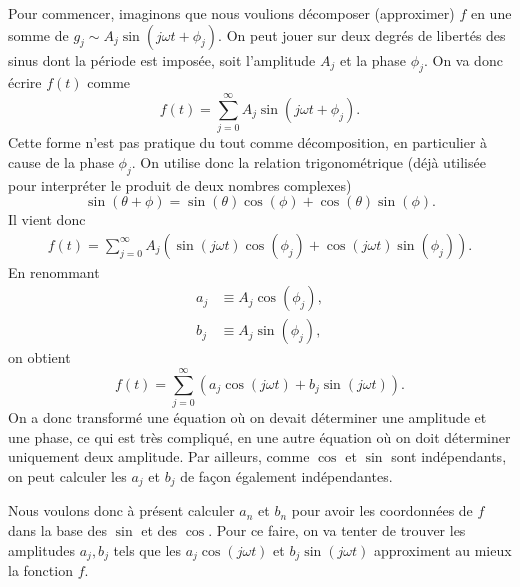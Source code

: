 \documentclass[a4paper,12pt]{book}
\begin{document}
Pour commencer, imaginons que nous voulions décomposer (approximer) $f$ en une somme de $g_j\sim A_j\sin(j\omega t+\phi_j)$.
On peut jouer sur deux degrés de libertés des sinus dont la période est imposée, soit l'amplitude $A_j$ et la phase $\phi_j$.
On va donc écrire $f(t)$ comme
\begin{equation}
 f(t)=\sum_{j=0}^\infty A_j\sin(j\omega t+\phi_j).\label{eq_sin_phase_ampl}
\end{equation}
Cette forme n'est pas pratique du tout comme décomposition, en particulier à cause de la phase $\phi_j$. On utilise donc la relation trigonométrique
(déjà utilisée pour interpréter le produit de deux nombres complexes)
\begin{equation*}
 \sin(\theta+\phi)=\sin(\theta)\cos(\phi)+\cos(\theta)\sin(\phi).
\end{equation*}
Il vient donc
\begin{align}
 f(t)=\sum_{j=0}^\infty A_j\left(\sin(j\omega t)\cos(\phi_j)+\cos(j\omega t)\sin(\phi_j)\right).
\end{align}
En renommant 
\begin{align}
a_j&\equiv A_j\cos(\phi_j),\\
b_j&\equiv A_j\sin(\phi_j),
\end{align}
on obtient
\begin{equation}
 f(t)=\sum_{j=0}^\infty \left(a_j\cos(j\omega t)+b_j\sin(j\omega t)\right). \label{eq_decomp_sincos}
\end{equation}
On a donc transformé une équation où on devait déterminer une amplitude et une phase, ce qui est très compliqué, en une autre
équation où on doit déterminer uniquement deux amplitude. Par ailleurs, comme $\cos$ et $\sin$ sont indépendants,
on peut calculer les $a_j$ et $b_j$ de façon également indépendantes.

Nous voulons donc à présent calculer $a_n$ et $b_n$ pour avoir les coordonnées de $f$ dans la base 
des $\sin$ et des $\cos$. Pour ce faire, on va tenter de trouver les amplitudes $a_j,b_j$ tels
que les $a_j\cos(j\omega t)$ et $b_j\sin(j\omega t)$ approximent au mieux la fonction $f$.
\end{document}
